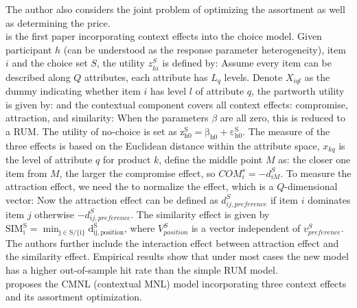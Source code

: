 \documentclass[12pt]{report}
\begin{document}
The author also considers the joint problem of optimizing the assortment as well as determining the price.\\ 
\cite{rooderkerk2011incorporating} is the first paper incorporating context effects into the  choice model. 
Given participant $h$ (can be understood as the response parameter heterogeneity), item $i$ and the choice set $S$, the utility $z_{hi}^S$ is defined by:
Assume every item can be described along $Q$ attributes, each attribute has $L_q$ levels. 
Denote $X_{iql}$ as the dummy indicating whether item $i$ has level $l$ of attribute $q$, the partworth utility is given by:
and the contextual component covers all context effects: compromise, attraction, and similarity:
When the parameters $\beta$ are all zero, this is reduced to a RUM. 
The utility of no-choice is set as $\mathrm{z_{h0}^S=\beta_{h0}+\varepsilon_{h0}^S.}$
The measure of the three effects is based on the Euclidean distance within the attribute space, $x_{kq}$ is the level of attribute $q$ for product $k$, define the middle point $M$ as:
the closer one item from $M$, the larger the compromise effect, so $COM_i^s=-d_{iM}^S$. 
To measure the attraction effect, we need the  to normalize the effect, which is a $Q$-dimensional vector:
Now the attraction effect can be defined as $d_{ij,preference}^S$ if item $i$ dominates item $j$ otherwise $-d_{ij,preference}^S$. 
The similarity effect is given by $\mathrm{SIM_i^S=\min_{j\in S/\{i\}}d_{ij,position}^S}$, where $V_{position}^S$ is a vector independent of $v_{preference}^S$. 
The authors further include the interaction effect between attraction effect and the similarity effect.
Empirical results show that under most cases the new model has a higher out-of-sample hit rate than the simple RUM model.\\
\cite{yousefi2020choice} proposes the CMNL (contextual MNL) model incorporating three context effects and its assortment optimization. 
\end{document}
